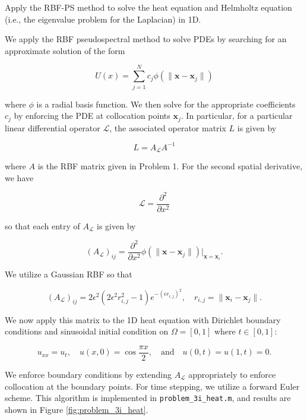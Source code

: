 Apply the RBF-PS method to solve the heat equation and Helmholtz equation (i.e., the eigenvalue problem for the 
Laplacian) in 1D.

\begin{solution}
    We apply the RBF pseudospectral method to solve PDEs by searching for an approximate solution of the form

    \begin{equation}\label{eq:rbf-approximation}
        U(x) = \sum\limits_{j=1}^N c_j \phi(\lVert \bm{x} - \bm{x}_j \rVert)
    \end{equation}

    where $\phi$ is a radial basis function. We then solve for the appropriate coefficients $c_j$ by enforcing the PDE 
    at collocation points $\bm{x}_j$. In particular, for a particular linear differential operator $\mathcal{L}$,
    the associated operator matrix $L$ is given by

    $$
    L = A_{\mathcal{L}} A^{-1}
    $$

    where $A$ is the RBF matrix given in Problem 1. For the second spatial derivative, we have

    $$
    \mathcal{L} = \frac{\partial^2}{\partial x^2}
    $$

    so that each entry of $A_{\mathcal{L}}$ is given by

    $$
    (A_{\mathcal{L}})_{ij} = \frac{\partial^2}{\partial x^2} \phi(\lVert \bm{x} - \bm{x}_j \rVert)\bigg|_{\bm{x} = \bm{x}_i}.
    $$

    We utilize a Gaussian RBF so that

    $$
    (A_{\mathcal{L}})_{ij} = 2 \epsilon^2 \left(2 \epsilon^2 r_{i,j}^2 - 1 \right) e^{-(\epsilon r_{i,j})^2}, \quad r_{i,j} = \lVert \bm{x}_i - \bm{x}_j \rVert.
    $$

    We now apply this matrix to the 1D heat equation with Dirichlet boundary conditions and sinusoidal initial 
    condition on $\Omega = [0, 1]$ where $t \in [0, 1]$: 
    
    $$
    u_{xx} = u_t,  \quad u(x, 0) = \cos{\frac{\pi x}{2}}, \quad \text{and} \quad u(0, t) = u(1, t) = 0. 
    $$

    We enforce boundary conditions by extending $A_{\mathcal{L}}$ appropriately to enforce collocation at the boundary 
    points. For time stepping, we utilize a forward Euler scheme. This algorithm is implemented in 
    \texttt{problem\_3i\_heat.m}, and results are shown in Figure \ref{fig:problem_3i_heat}.
    

\end{solution}
